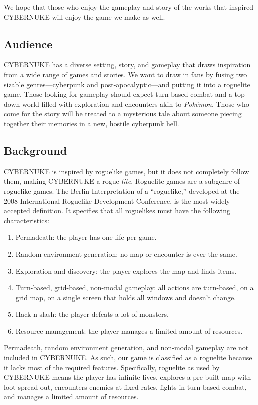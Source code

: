 \documentclass[10pt,conference,onecolumn,compsoc]{IEEEtran}
\begin{document}
We hope that those who enjoy the gameplay and story of the works that inspired CYBERNUKE will enjoy the game we make as well.

\subsection{Audience}
CYBERNUKE has a diverse setting, story, and gameplay that draws inspiration from a wide range of games and stories. We want to draw in fans by fusing two sizable genres—cyberpunk and post-apocalyptic—and putting it into a roguelite game. Those looking for gameplay should expect turn-based combat and a top-down world filled with exploration and encounters akin to \emph{Pokémon}. Those who come for the story will be treated to a mysterious tale about someone piecing together their memories in a new, hostile cyberpunk hell. 

\subsection{Background}
CYBERNUKE is inspired by roguelike games, but it does not completely follow them, making CYBERNUKE a rogue-\emph{lite}. Roguelite games are a subgenre of roguelike games. The Berlin Interpretation of a “roguelike,” developed at the 2008 International Roguelike Development Conference, is the most widely accepted definition. It specifies that all roguelikes must have the following characteristics\cite{IEEEhowto:roguelite_2}:
\begin{enumerate}
\item Permadeath: the player has one life per game.
\item Random environment generation: no map or encounter is ever the same.
\item Exploration and discovery: the player explores the map and finds items.
\item Turn-based, grid-based, non-modal gameplay: all actions are turn-based, on a grid map, on a single screen that holds all windows and doesn't change.
\item Hack-n-slash: the player defeats a lot of monsters.
\item Resource management: the player manages a limited amount of resources.
\end{enumerate}
Permadeath, random environment generation, and non-modal gameplay are not included in CYBERNUKE. As such, our game is classified as a roguelite because it lacks most of the required features. Specifically, roguelite as used by CYBERNUKE means the player has infinite lives, explores a pre-built map with loot spread out, encounters enemies at fixed rates, fights in turn-based combat, and manages a limited amount of resources.
\end{document}
